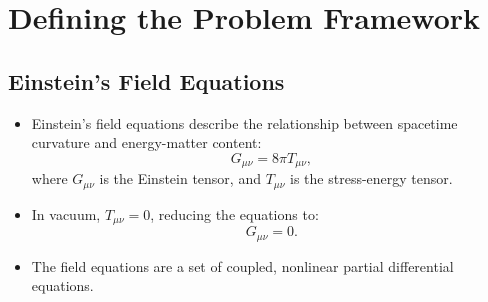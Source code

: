 \documentclass[12pt]{article}
\begin{document}
\section{Defining the Problem Framework}

\subsection{Einstein's Field Equations}
\begin{itemize}
    \item Einstein's field equations describe the relationship between spacetime curvature and energy-matter content:
    \begin{equation}
        G_{\mu\nu} = 8\pi T_{\mu\nu},
    \end{equation}
    where $G_{\mu\nu}$ is the Einstein tensor, and $T_{\mu\nu}$ is the stress-energy tensor.
    \item In vacuum, $T_{\mu\nu} = 0$, reducing the equations to:
    \begin{equation}
        G_{\mu\nu} = 0.
    \end{equation}
    \item The field equations are a set of coupled, nonlinear partial differential equations.
\end{itemize}
\end{document}
